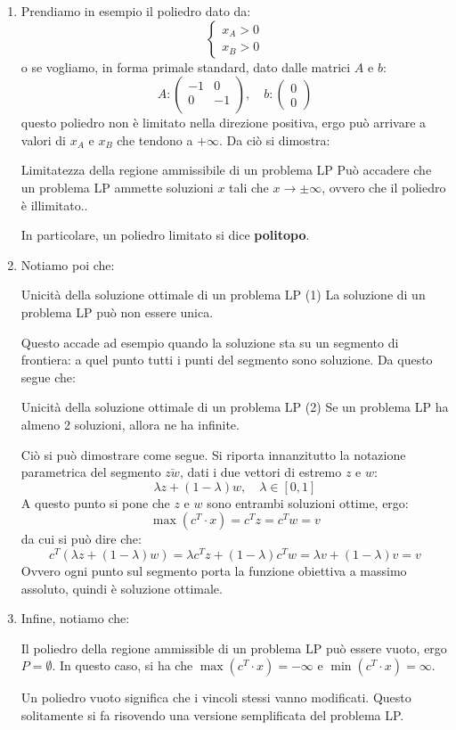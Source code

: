\documentclass[a4paper,11pt]{article}
\begin{document}
\begin{enumerate}
	\item 
		Prendiamo in esempio il poliedro dato da:
		\[
			\begin{cases}
				x_A > 0 \\ 
				x_B > 0
			\end{cases}
		\]
		o se vogliamo, in forma primale standard, dato dalle matrici $A$ e $b$:
		$$
		A:
		\begin{pmatrix}
			-1 & 0 \\	
			0 & -1 \\	
		\end{pmatrix}
		, \quad b:
		\begin{pmatrix}
			0 \\ 
			0
		\end{pmatrix}
		$$
		questo poliedro non è limitato nella direzione positiva, ergo può arrivare a valori di $x_A$ e $x_B$ che tendono a $+\infty$.
		Da ciò si dimostra:
		\begin{theorem}{Limitatezza della regione ammissibile di un problema LP}
			Può accadere che un problema LP ammette soluzioni $x$ tali che $x \rightarrow \pm \infty $,
			ovvero che il poliedro è illimitato..
		\end{theorem}
		In particolare, un poliedro limitato si dice \textbf{politopo}.
	\item Notiamo poi che:
		\begin{theorem}{Unicità della soluzione ottimale di un problema LP (1)}
			La soluzione di un problema LP può non essere unica.
		\end{theorem}
		Questo accade ad esempio quando la soluzione sta su un segmento di frontiera: a quel punto tutti i punti del segmento sono soluzione.
		Da questo segue che:
		\begin{theorem}{Unicità della soluzione ottimale di un problema LP (2)}
			Se un problema LP ha almeno 2 soluzioni, allora ne ha infinite.
		\end{theorem}
		Ciò si può dimostrare come segue.
		Si riporta innanzitutto la notazione parametrica del segmento $\bar{zw}$, dati i due vettori di estremo $z$ e $w$:
		$$
			\lambda z + (1 - \lambda)w, \quad \lambda \in [ 0, 1 ]
		$$
		A questo punto si pone che $z$ e $w$ sono entrambi soluzioni ottime, ergo: 
		$$ 
			\max(c^T \cdot x) = c^T z = c^T w = v 
		$$
		da cui si può dire che:
		$$ 
			c^T\left(\lambda z + (1 - \lambda)w\right) = \lambda c^T z + (1 - \lambda) c^T w = \lambda v + (1 - \lambda) v = v 
		$$
		Ovvero ogni punto sul segmento porta la funzione obiettiva a massimo assoluto, quindi è soluzione ottimale.
	\item Infine, notiamo che:
		\begin{theorem}{}
			Il poliedro della regione ammissible di un problema LP può essere vuoto, ergo $P = \emptyset$.
			In questo caso, si ha che $ \max(c^T \cdot x) = -\infty $ e $ \min(c^T \cdot x) = \infty $. 
		\end{theorem}	
		Un poliedro vuoto significa che i vincoli stessi vanno modificati. 
		Questo solitamente si fa risovendo una versione semplificata del problema LP.
\end{enumerate}
\end{document}
